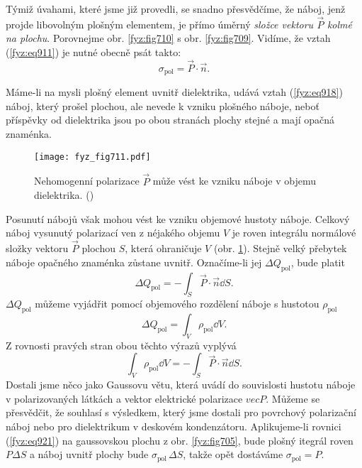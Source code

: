     Týmiž úvahami, které jsme již provedli, se snadno přesvědčíme, že náboj, jenž projde libovolným
    plošným elementem, je přímo úměrný \emph{složce vektoru \(\vec{P}\) kolmé na plochu}. Porovnejme
    obr. \ref{fyz:fig710} s obr. \ref{fyz:fig709}. Vidíme, že vztah (\ref{fyz:eq911}) je nutné
    obecně psát takto:
    \begin{equation}\label{fyz:eq918}
      σ_{\text{pol}}=\vec{P}\cdot\vec{n}.
    \end{equation}

    Máme-li na mysli plošný element uvnitř dielektrika, udává vztah (\ref{fyz:eq918}) náboj, který
    prošel plochou, ale nevede k vzniku plošného náboje, neboť příspěvky od dielektrika jsou po obou
    stranách plochy stejné a mají opačná znaménka.

    \begin{figure}[ht!] %
      \centering
      \texttt{[image: fyz\_fig711.pdf]}
      \caption{Nehomogenní polarizace \(\vec{P}\) může vést ke vzniku náboje v objemu dielektrika.
               (\cite[s.~707]{Feynman02})}
      \label{fyz:fig711}
    \end{figure}

    Posunutí nábojů však mohou vést ke vzniku objemové hustoty náboje. Celkový náboj vysunutý
    polarizací ven z néjakého objemu \(V\) je roven integrálu normálové složky vektoru \(\vec{P}\)
    plochou \(S\), která ohraničuje \(V\) (obr. \ref{fyz:fig711}). Stejně velký přebytek náboje
    opačného znaménka zůstane uvnitř. Označíme-li jej \(ΔQ_{\text{pol}}\), bude platit
    \begin{equation}\label{fyz:eq919}
      \Delta Q_{\text{pol}}=-\int_S\vec{P}\cdot\vec{n}\dd{S}.
    \end{equation}
    \(\Delta Q_{\text{pol}}\) můžeme vyjádřit pomocí objemového rozdělení náboje s hustotou
    \(ρ_{\text{pol}}\)
    \begin{equation}\label{fyz:eq920}
      \Delta Q_{\text{pol}}=\int_V\rho_{\text{pol}}\dd{V}.
    \end{equation}
    Z rovnosti pravých stran obou těchto výrazů vyplývá
    \begin{equation}\label{fyz:eq921}
      \int_V\rho_{\text{pol}}\dd{V}=-\int_S\vec{P}\cdot\vec{n}\dd{S}.
    \end{equation}
    Dostali jsme něco jako Gaussovu větu, která uvádí do souvislosti hustotu náboje v polarizovaných
    látkách a vektor elektrické polarizace \(vec{P}\). Můžeme se přesvědčit, že souhlasí s
    výsledkem, který jsme dostali pro povrchový polarizační náboj nebo pro dielektrikum v deskovém
    kondenzátoru. Aplikujeme-li rovnici (\ref{fyz:eq921}) na gaussovskou plochu z obr.
    \ref{fyz:fig705}, bude plošný itegrál roven \(PΔS\) a náboj uvnitř plochy bude
    \(\sigma_{\text{pol}}\,\Delta S\), takže opět dostáváme \(σ_{\text{pol}}=P\).
    
